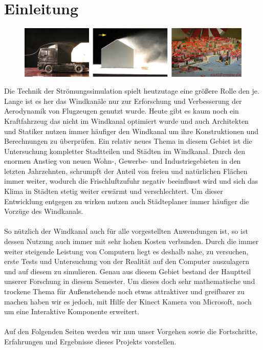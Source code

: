 \chapter{Einleitung}
\begin{Spacing}{\mylinespace}
\begin{figure}[h!]
	\centering
	\includegraphics[width=\textwidth]{graphics/intro.png}
\end{figure}
Die Technik der Strömungssimulation spielt heutzutage eine größere Rolle den je. Lange ist es her das Windkanäle nur zur Erforschung und Verbesserung der Aerodynamik von Flugzeugen genutzt wurde. Heute gibt es kaum noch ein Kraftfahrzeug das nicht im Windkanal optimiert wurde und auch Architekten und Statiker nutzen immer häufiger den Windkanal um ihre Konstruktionen und Berechnungen zu überprüfen. Ein relativ neues Thema in diesem Gebiet ist die Untersuchung kompletter Stadtteilen und Städten im Windkanal. Durch den enormen Anstieg von neuen Wohn-, Gewerbe- und Industriegebieten in den letzten Jahrzehnten, schrumpft der Anteil von freien und natürlichen Flächen immer weiter, wodurch die Frischluftzufuhr negativ beeinflusst wird und sich das Klima in Städten stetig weiter erwärmt und verschlechtert. Um dieser Entwicklung entgegen zu wirken nutzen auch Städteplaner immer häufiger die Vorzüge des Windkanals.
\\\\
So nützlich der Windkanal auch für alle vorgestellten Anwendungen ist, so ist dessen Nutzung auch immer mit sehr hohen Kosten verbunden. Durch die immer weiter steigende Leistung von Computern liegt es deshalb nahe, zu versuchen, erste Tests und Untersuchung von der Realität auf den Computer auszulagern und auf diesem zu simulieren. Genau aus diesem Gebiet bestand der Hauptteil unserer Forschung in diesem Semester. Um dieses doch sehr mathematische und trockene Thema für Außenstehende noch etwas attraktiver und greifbarer zu machen haben wir es jedoch, mit Hilfe der Kinect Kamera von Microsoft, noch um eine Interaktive Komponente erweitert.
\\\\
Auf den Folgenden Seiten werden wir nun unser Vorgehen sowie die Fortschritte, Erfahrungen und Ergebnisse dieses Projekts vorstellen.
\end{Spacing}
\newpage
\clearpage
